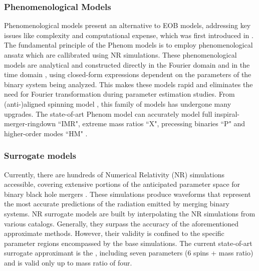 \subsubsection{Phenomenological Models}
Phenomenological models present an alternative to EOB models, addressing key issues like complexity and computational expense, which was first introduced in \cite{Ajith:2007qp}. The fundamental principle of the Phenom models is to employ phenomenological ansatz which are callibrated using NR simulations. These phenomenological models are analytical and constructed directly in the Fourier domain and in the time domain \cite{Estelles:2020twz}, using closed-form expressions dependent on the parameters of the binary system being analyzed. This makes these models rapid and eliminates the need for Fourier transformation during parameter estimation studies. From  (anti-)aligned spinning  model \cite{Ajith:2009bn}, this family of models has undergone many upgrades. The state-of-art Phenom model  can accurately model full inspiral-merger-ringdown ``IMR", extreme mass ratios ``X", precessing binaries ``P" and higher-order modes ``HM" \cite{Pratten:2020ceb}.


\subsubsection{Surrogate models}
Currently, there are hundreds of Numerical Relativity (NR) simulations accessible, covering extensive portions of the anticipated parameter space for binary black hole mergers \cite{Boyle:2019kee, Healy:2022wdn}. These simulations produce waveforms that represent the most accurate predictions of the radiation emitted by merging binary systems. NR surrogate models are built by interpolating the NR simulations from various catalogs. Generally, they surpass the accuracy of the aforementioned approximate methods. However, their validity is confined to the specific parameter regions encompassed by the base simulations. The current state-of-art surrogate approximant is the  \cite{Varma:2019csw}, including seven parameters (6 spins + mass ratio) and is valid only up to mass ratio of four. 




